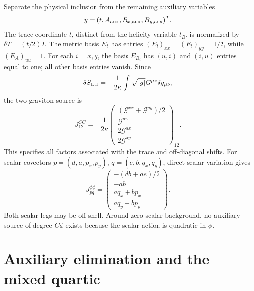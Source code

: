 \documentclass[11pt]{article}
\newcommand{\Gden}{\mathcal G}
\begin{document}
Separate the physical inclusion from the remaining auxiliary variables
\begin{equation}
 y=(t,A_{\rm aux},B_{x,\rm aux},B_{y,\rm aux})^T.
 \label{eq:y}
\end{equation}
The trace coordinate \(t\), distinct from the helicity variable \(t_B\), is normalized by \(\delta T=(t/2)I\).
The metric basis \(E_t\) has entries \((E_t)_{xx}=(E_t)_{yy}=1/2\), while \((E_A)_{uu}=1\).
For each \(i=x,y\), the basis \(E_{B_i}\) has \((u,i)\) and \((i,u)\) entries equal to one; all other basis entries vanish.
Since
\begin{equation}
 \delta S_{\rm EH}=-\frac{1}{2\kappa}\int
 \sqrt{|g|}G^{\mu\nu}\delta g_{\mu\nu},
 \label{eq:variation}
\end{equation}
the two-graviton source is
\begin{equation}
 \boxed{J^{CC}_{12}=-\frac{1}{2\kappa}
 \begin{pmatrix}
 (\Gden^{xx}+\Gden^{yy})/2\\\Gden^{uu}\\2\Gden^{ux}\\2\Gden^{uy}
 \end{pmatrix}_{12}.}
 \label{eq:JCC}
\end{equation}
This specifies all factors associated with the trace and off-diagonal shifts.
For scalar covectors \(p=(d,a,p_x,p_y)\), \(q=(e,b,q_x,q_y)\), direct scalar variation gives
\begin{equation}
 J^{\phi\phi}_{pq}=\begin{pmatrix}
 -(db+ae)/2\\-ab\\a q_x+b p_x\\a q_y+b p_y
 \end{pmatrix}.
 \label{eq:Jscalar}
\end{equation}
Both scalar legs may be off shell.
Around zero scalar background, no auxiliary source of degree \(C\phi\) exists because the scalar action is quadratic in \(\phi\).

\section{Auxiliary elimination and the mixed quartic}
\label{sec:quartic}
\end{document}
